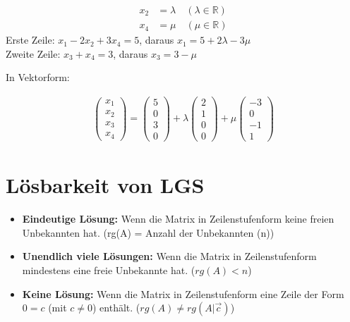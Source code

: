 \documentclass{article}
\begin{document}
\begin{minipage}[t]{0.45\textwidth}
    \begin{align*}
        x_2 &= \lambda \quad (\lambda \in \mathbb{R}) \\
        x_4 &= \mu \quad (\mu \in \mathbb{R})
    \end{align*}
    Erste Zeile: \( x_1 - 2x_2 + 3x_4 = 5 \), daraus \( x_1 = 5 + 2\lambda - 3\mu \)\\
    Zweite Zeile: \( x_3 + x_4 = 3 \), daraus \( x_3 = 3 - \mu \)
\end{minipage}
\hfill
\begin{minipage}[t]{0.45\textwidth}
    In Vektorform:

    \begin{align*}
        \begin{pmatrix}
        x_1 \\
        x_2 \\
        x_3 \\
        x_4
        \end{pmatrix}
        = 
        \begin{pmatrix}
        5 \\
        0 \\
        3 \\
        0
        \end{pmatrix}
        + \lambda
        \begin{pmatrix}
        2 \\
        1 \\
        0 \\
        0
        \end{pmatrix}
        + \mu
        \begin{pmatrix}
            -3 \\
            0 \\
            -1 \\
            1
        \end{pmatrix}
    \end{align*}
\end{minipage}

\section*{Lösbarkeit von LGS}
\begin{itemize}
    \item \textbf{Eindeutige Lösung:} Wenn die Matrix in Zeilenstufenform keine freien Unbekannten hat. (rg(A) = Anzahl der Unbekannten (n))
    \item \textbf{Unendlich viele Lösungen:} Wenn die Matrix in Zeilenstufenform mindestens eine freie Unbekannte hat. ($rg(A) <  n$)
    \item \textbf{Keine Lösung:} Wenn die Matrix in Zeilenstufenform eine Zeile der Form \(0 = c\) (mit \(c \neq 0\)) enthält. ($rg(A) \neq rg(A|\vec{c})$)
\end{itemize}
\end{document}

